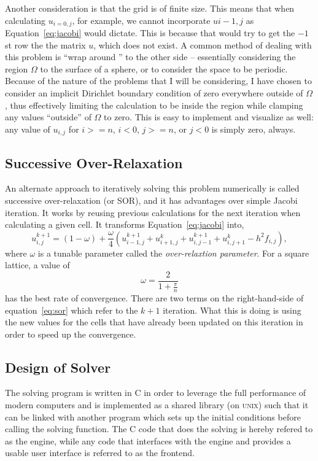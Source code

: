 Another consideration is that the grid is of finite size. This means that when calculating $u_{i=0,j}$, for example, we cannot
incorporate $u{i-1,j}$ as Equation~\ref{eq:jacobi} would dictate. This is because that would try to get the $-1$st row the
the matrix $u$, which does not exist. A common method of dealing with this problem is ``wrap around '' to the other side --
essentially considering the region $\Omega$ to the surface of a sphere, or to consider the space to be periodic. Because of
the nature of the problems that I will be considering, I have chosen to consider an implicit Dirichlet boundary condition
of zero everywhere outside of $\Omega$, thus effectively limiting the calculation to be inside the region while clamping any
values ``outside'' of $\Omega$ to zero. This is easy to implement and visualize as well: any value of $u_{i,j}$ for $i >= n$,
$i < 0$, $j >= n$, or $j < 0$ is simply zero, always.

\subsection{Successive Over-Relaxation}

An alternate approach to iteratively solving this problem numerically is called successive over-relaxation (or SOR), and
it has advantages over simple Jacobi iteration. It works by reusing previous calculations for the next iteration when
calculating a given cell. It transforms Equation~\ref{eq:jacobi} into,
\begin{equation} \label{eq:sor}
u_{i,j}^{k+1} = (1-\omega) + \frac{\omega}{4}\left(u_{i-1,j}^{k+1} + u_{i+1,j}^{k} + u_{i,j-1}^{k+1} + u_{i,j+1}^{k} - h^2 f_{i,j}\right),
\end{equation}
where $\omega$ is a tunable parameter called the \textit{over-relaxtion parameter}. For a square lattice, a value of
$$\omega = \frac{2}{1+\frac{\pi}{n}}$$
has the best rate of convergence\cite{poisson-relax}. There are two terms on the right-hand-side of equation~\ref{eq:sor} which refer to the
$k+1$ iteration. What this is doing is using the new values for the cells that have already been updated on this iteration
in order to speed up the convergence.




\subsection{Design of Solver}
The solving program is written in C in order to leverage the full performance of modern computers and is implemented
as a shared library (on \textsc{unix}) such that it can be linked with another program which sets up the initial conditions
before calling the solving function. The C code that does the solving is hereby refered to as the engine, while any code
that interfaces with the engine and provides a usable user interface is referred to as the frontend.

